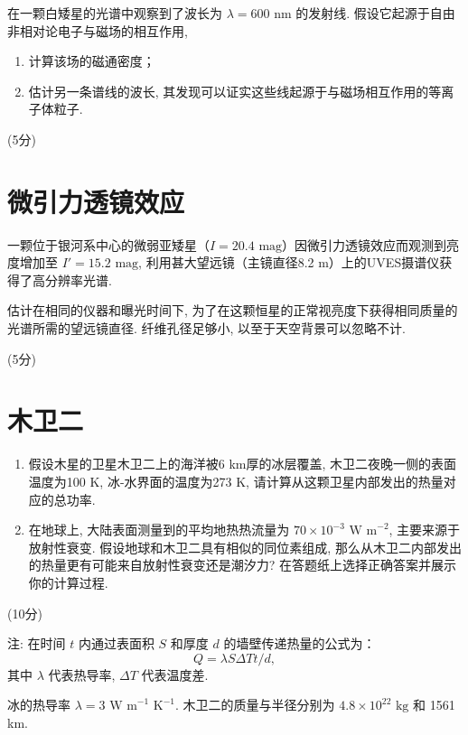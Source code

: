 \documentclass[a4paper,fontset=fandol]{ctexart}
\newcommand{\points}[1]{\par %
	\noindent %
	\hfill (#1分)%
	\vspace{1em}
	}
\begin{document}
	在一颗白矮星的光谱中观察到了波长为 $\lambda = 600\text{ nm}$ 的发射线. 假设它起源于自由非相对论电子与磁场的相互作用, 
	\begin{enumerate}[label=(\alph*)]
		\item 计算该场的磁通密度；
		
		\item 估计另一条谱线的波长, 其发现可以证实这些线起源于与磁场相互作用的等离子体粒子. 
	\end{enumerate}
	
	\points{5}
	
	\section{微引力透镜效应}
	
	一颗位于银河系中心的微弱亚矮星（$I=20.4\text{ mag}$）因微引力透镜效应而观测到亮度增加至 $I'=15.2\text{ mag}$, 利用甚大望远镜（主镜直径8.2 m）上的UVES摄谱仪获得了高分辨率光谱. 
	
	估计在相同的仪器和曝光时间下, 为了在这颗恒星的正常视亮度下获得相同质量的光谱所需的望远镜直径. 纤维孔径足够小, 以至于天空背景可以忽略不计. 
	
	\points{5}
	
	\section{木卫二}
	
	\begin{enumerate}[label=(\alph*)]
		\item 假设木星的卫星木卫二上的海洋被6 km厚的冰层覆盖, 木卫二夜晚一侧的表面温度为100 K, 冰-水界面的温度为273 K, 请计算从这颗卫星内部发出的热量对应的总功率. 
		
		\item 在地球上, 大陆表面测量到的平均地热热流量为 $70\times10^{-3}\text{ W m}^{-2}$, 主要来源于放射性衰变. 假设地球和木卫二具有相似的同位素组成, 那么从木卫二内部发出的热量更有可能来自放射性衰变还是潮汐力? 在答题纸上选择正确答案并展示你的计算过程. 
	\end{enumerate}
	
	\points{10}
	
	\vspace{-1em}
	注: 在时间 $t$ 内通过表面积 $S$ 和厚度 $d$ 的墙壁传递热量的公式为：
	\[ Q = \lambda S \Delta T t / d, \]
	其中 $\lambda$ 代表热导率, $\Delta T$ 代表温度差. 
	
	冰的热导率 $\lambda = 3\text{ W m}^{-1}\text{ K}^{-1}$. 木卫二的质量与半径分别为 $4.8 \times 10^{22} \text{ kg}$ 和 1561 km. 
	
\end{document}
